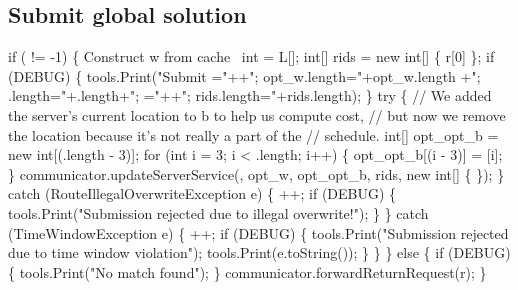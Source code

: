 \subsection{Submit global solution}
\nwenddocs{}\endmoddef\nwstartdeflinemarkup{}\nwenddeflinemarkup
if ( != -1) \{
  \LA{}Construct w from cache~{\nwtagstyle{}}\RA{}
  int  = L[];
  int[] rids = new int[] \{ r[0] \};
  if (DEBUG) \{
    tools.Print("Submit ="++"; opt_w.length="+opt_w.length
      +"; .length="+.length+"; ="++"; rids.length="+rids.length);
  \}
  try \{
    // We added the server's current location to b to help us compute cost,
    // but now we remove the location because it's not really a part of the
    // schedule.
    int[] opt_opt_b = new int[(.length - 3)];
    for (int i = 3; i < .length; i++) \{
      opt_opt_b[(i - 3)] = [i];
    \}
    communicator.updateServerService(, opt_w, opt_opt_b, rids, new int[] \{ \});
  \} catch (RouteIllegalOverwriteException e) \{
    ++;
    if (DEBUG) \{
      tools.Print("Submission rejected due to illegal overwrite!");
    \}
  \} catch (TimeWindowException e) \{
    ++;
    if (DEBUG) \{
      tools.Print("Submission rejected due to time window violation");
      tools.Print(e.toString());
    \}
  \}
\} else \{
  if (DEBUG) \{
    tools.Print("No match found");
  \}
  communicator.forwardReturnRequest(r);
\}
\nwendcode{}\nwdocspar

